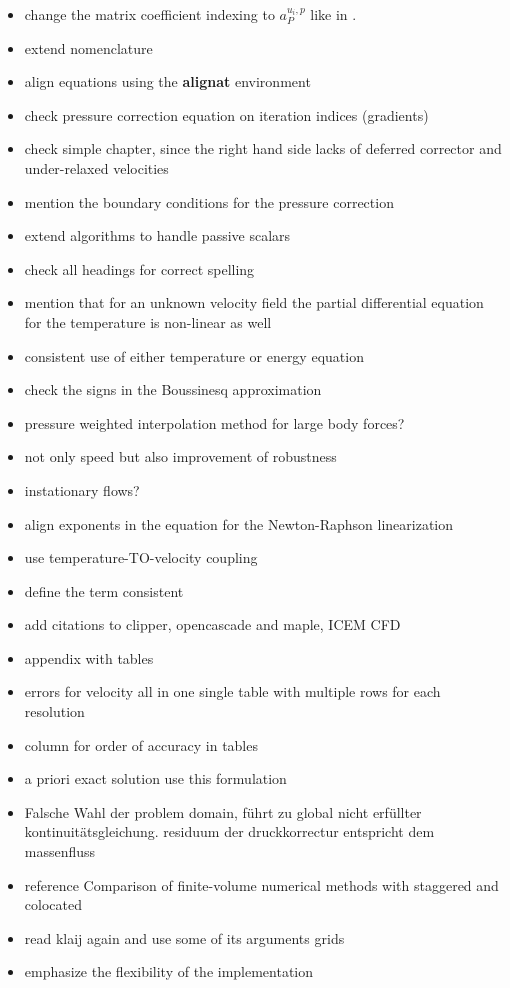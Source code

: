 \documentclass[article,type=msc,colorback,accentcolor=tud2a]{tudthesis}
\begin{document}
  \begin{itemize}
    \item change the matrix coefficient indexing to \(a_P^{u_i,p}\) like in \cite{darwish09}.
    \item extend nomenclature
    \item align equations using the \textbf{alignat} environment
    \item check pressure correction equation on iteration indices (gradients)
    \item check simple chapter, since the right hand side lacks of deferred corrector and under-relaxed velocities
    \item mention the boundary conditions for the pressure correction
    \item extend algorithms to handle passive scalars
    \item check all headings for correct spelling
    \item mention that for an unknown velocity field the partial differential equation for the temperature is non-linear as well
    \item consistent use of either temperature or energy equation
    \item check the signs in the Boussinesq approximation
    \item pressure weighted interpolation method for large body forces?
    \item not only speed but also improvement of robustness
    \item instationary flows?
    \item align exponents in the equation for the Newton-Raphson linearization
    \item use temperature-TO-velocity coupling
    \item define the term consistent
    \item add citations to clipper, opencascade and maple, ICEM CFD
    \item appendix with tables
    \item errors for velocity all in one single table with multiple rows for each resolution
    \item column for order of accuracy in tables 
    \item a priori exact solution use this formulation
    \item Falsche Wahl der problem domain, führt zu global nicht erfüllter kontinuitätsgleichung. residuum der druckkorrectur entspricht dem massenfluss
    \item reference Comparison of finite-volume numerical methods with staggered and colocated
    \item read klaij again and use some of its arguments
      grids
    \item emphasize the flexibility of the implementation
  \end{itemize}
\end{document}
